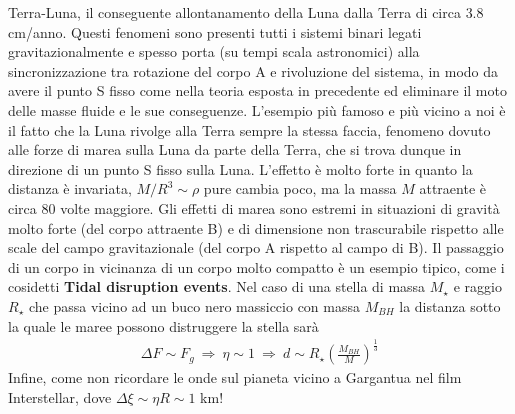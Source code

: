 \documentclass[a4paper, oneside]{book}
\begin{document}
Terra-Luna, il conseguente allontanamento della Luna dalla Terra di circa 
$3.8$ cm/anno. Questi fenomeni sono presenti tutti i sistemi binari legati gravitazionalmente 
e spesso porta (su tempi scala astronomici) alla sincronizzazione tra rotazione 
del corpo A e rivoluzione del sistema, in modo da avere il punto S fisso come nella teoria esposta in 
precedente ed eliminare il moto delle masse fluide e le sue conseguenze. L'esempio 
più famoso e più vicino a noi è il fatto che 
la Luna rivolge alla Terra sempre la stessa faccia, fenomeno 
dovuto alle forze di marea sulla Luna da parte della Terra, che si trova dunque
in direzione di un punto S fisso sulla Luna. L'effetto è molto forte in quanto la distanza 
è invariata, $M/R^{3} \sim \rho$ pure cambia poco, 
ma la massa $M$ attraente è circa 80 volte maggiore. Gli effetti di marea sono estremi 
in situazioni di gravità molto forte (del corpo attraente B) e di dimensione 
non trascurabile rispetto alle scale del campo gravitazionale 
(del corpo A rispetto al campo di B). Il passaggio di un corpo in vicinanza 
di un corpo molto compatto è un esempio tipico, 
come i cosidetti \textbf{Tidal disruption events}. Nel caso di una stella di massa
$M_\star$ e raggio $R_\star$ che passa vicino ad un buco nero massiccio con 
massa $M_{BH}$ la distanza sotto la quale le maree possono distruggere la stella sarà
\begin{gather*}
    \Delta F \sim F_g \ \Longrightarrow \ \eta \sim 1 \ \Longrightarrow \ d \sim R_\star \left(\frac{M_{BH}}{M}\right)^{\frac{1}{3}}
\end{gather*} 
Infine, come non ricordare le onde sul pianeta vicino a Gargantua nel film Interstellar, dove
$\Delta \xi \sim \eta R \sim 1$ km!
\end{document}
